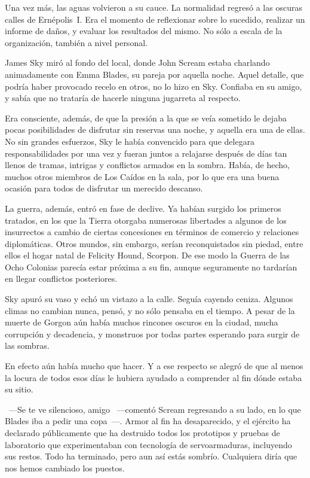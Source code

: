 \noindent
Una vez más, las aguas volvieron a su cauce. La normalidad regresó a las oscuras calles de Ernépolis~I. Era el momento de reflexionar sobre lo sucedido, realizar un informe de daños, y evaluar los resultados del mismo. No sólo a escala de la organización, también a nivel personal.

\parbreak\noindent
James Sky miró al fondo del local, donde John Scream estaba charlando animadamente con Emma Blades, su pareja por aquella noche. Aquel detalle, que podría haber provocado recelo en otros, no lo hizo en Sky. Confiaba en su amigo, y sabía que no trataría de hacerle ninguna jugarreta al respecto.

Era consciente, además, de que la presión a la que se veía sometido le dejaba pocas posibilidades de disfrutar sin reservas una noche, y aquella era una de ellas. No sin grandes esfuerzos, Sky le había convencido para que delegara responsabilidades por una vez y fueran juntos a relajarse después de días tan llenos de tramas, intrigas y conflictos armados en la sombra. Había, de hecho, muchos otros miembros de Los Caídos en la sala, por lo que era una buena ocasión para todos de disfrutar un merecido descanso.

La guerra, además, entró en fase de declive. Ya habían surgido los primeros tratados, en los que la Tierra otorgaba numerosas libertades a algunos de los insurrectos a cambio de ciertas concesiones en términos de comercio y relaciones diplomáticas. Otros mundos, sin embargo, serían reconquistados sin piedad, entre ellos el hogar natal de Felicity Hound, Scorpon. De ese modo la Guerra de las Ocho Colonias parecía estar próxima a su fin, aunque seguramente no tardarían en llegar conflictos posteriores.

Sky apuró su vaso y echó un vistazo a la calle. Seguía cayendo ceniza. Algunos climas no cambian nunca, pensó, y no sólo pensaba en el tiempo. A pesar de la muerte de Gorgon aún había muchos rincones oscuros en la ciudad, mucha corrupción y decadencia, y monstruos por todas partes esperando para surgir de las sombras.

En efecto aún había mucho que hacer. Y a ese respecto se alegró de que al menos la locura de todos esos días le hubiera ayudado a comprender al fin dónde estaba su sitio.

~---Se te ve silencioso, amigo ~---comentó Scream regresando a su lado, en lo que Blades iba a pedir una copa~---. Armor al fin ha desaparecido, y el ejército ha declarado públicamente que ha destruido todos los prototipos y pruebas de laboratorio que experimentaban con tecnología de servoarmaduras, incluyendo sus restos. Todo ha terminado, pero aun así estás sombrío. Cualquiera diría que nos hemos cambiado los puestos.


